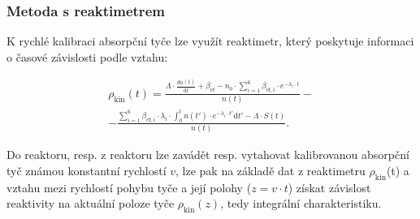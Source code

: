 \subsubsection{Metoda s reaktimetrem}

K rychlé kalibraci absorpční tyče lze využít reaktimetr, který poskytuje informaci o časové závislosti podle vztahu:

\begin{equation} \label{rektimetr}
    \boxed{
    \begin{multlined}
    \rho_\text{kin} (t) = \frac{\Lambda \cdot \frac{dn(t)}{\text{d}t} + \beta_\text{ef}-n_\text{0}\cdot \sum_{i=1}^6\beta_{\text{ef},i}\cdot e^{-\lambda_i \cdot t}}{n(t)} -\\
    - \frac{\sum_{i=1}^6\beta_{\text{ef},i}\cdot \lambda_i \cdot \int_0^t n(t') \cdot e^{-\lambda_i \cdot t'} \text{d}t' -\Lambda \cdot S(t)}{n(t)}.
    \end{multlined}}
\end{equation}

Do reaktoru, resp. z reaktoru lze zavádět resp. vytahovat kalibrovanou absorpční tyč
známou konstantní rychlostí $v$, lze pak na základě dat z reaktimetru $\rho_\text{kin}$(t) a vztahu mezi
rychlostí pohybu tyče a její polohy ($z = v \cdot t$) získat závislost reaktivity na aktuální poloze tyče $\rho_\text{kin} (z)$, tedy integrální charakteristiku.